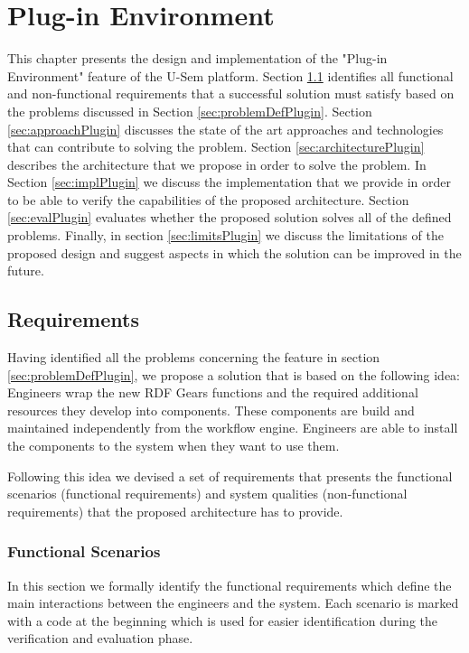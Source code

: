 
\chapter{Plug-in Environment}
\label{cha:plug-in}

This chapter presents the design and implementation of the "Plug-in Environment" feature of the U-Sem platform. Section \ref{sec:requirementsPlugin} identifies all functional and non-functional requirements that a successful solution must satisfy based on the problems discussed in Section \ref{sec:problemDefPlugin}. Section \ref{sec:approachPlugin} discusses the state of the art approaches and technologies that can contribute to solving the problem. Section \ref{sec:architecturePlugin} describes the architecture that we propose in order to solve the problem. In Section \ref{sec:implPlugin} we discuss the implementation that we provide in order to be able to verify the capabilities of the proposed architecture. Section \ref{sec:evalPlugin} evaluates whether the proposed solution solves all of the defined problems. Finally, in section \ref{sec:limitsPlugin} we discuss the limitations of the proposed design and suggest aspects in which the solution can be improved in the future.

\section{Requirements}
\label{sec:requirementsPlugin}

Having identified all the problems concerning the feature in section \ref{sec:problemDefPlugin}, we propose a solution that is based on the following idea: Engineers wrap the new RDF Gears functions and the required additional resources they develop into components. These components are build and maintained independently from the workflow engine. Engineers are able to install the components to the system when they want to use them.

Following this idea we devised a set of requirements that presents the functional scenarios (functional requirements) and system qualities (non-functional requirements) that the proposed architecture has to provide.

\subsection{Functional Scenarios}
In this section we formally identify the functional requirements which define the main interactions between the engineers and the system. Each scenario is marked with a code at the beginning which is used for easier identification during the verification and evaluation phase.

